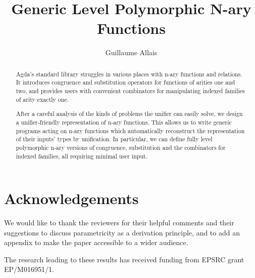 \documentclass[sigplan,screen]{acmart}
\begin{document}
\title{}

\title{Generic Level Polymorphic N-ary Functions}

\author{Guillaume Allais}


\begin{abstract}
Agda's standard library struggles in various places with n-ary functions and
relations. It introduces congruence and substitution operators for functions
of arities one and two, and provides users with convenient combinators for
manipulating indexed families of arity exactly one.

After a careful analysis of the kinds of problems the unifier can easily solve,
we design a unifier-friendly representation of n-ary functions. This allows us
to write generic programs acting on n-ary functions which automatically reconstruct
the representation of their inputs' types by unification. In particular, we can
define fully level polymorphic n-ary versions of congruence, substitution and the
combinators for indexed families, all requiring minimal user input.
\end{abstract}

\maketitle



\appendix


\section*{Acknowledgements}

We would like to thank the reviewers for their helpful comments and their
suggestions to discuss parametricity as a derivation principle, and to add
an appendix to make the paper accessible to a wider audience.

The research leading to these results has received funding from EPSRC
grant EP/M016951/1.



\end{document}
